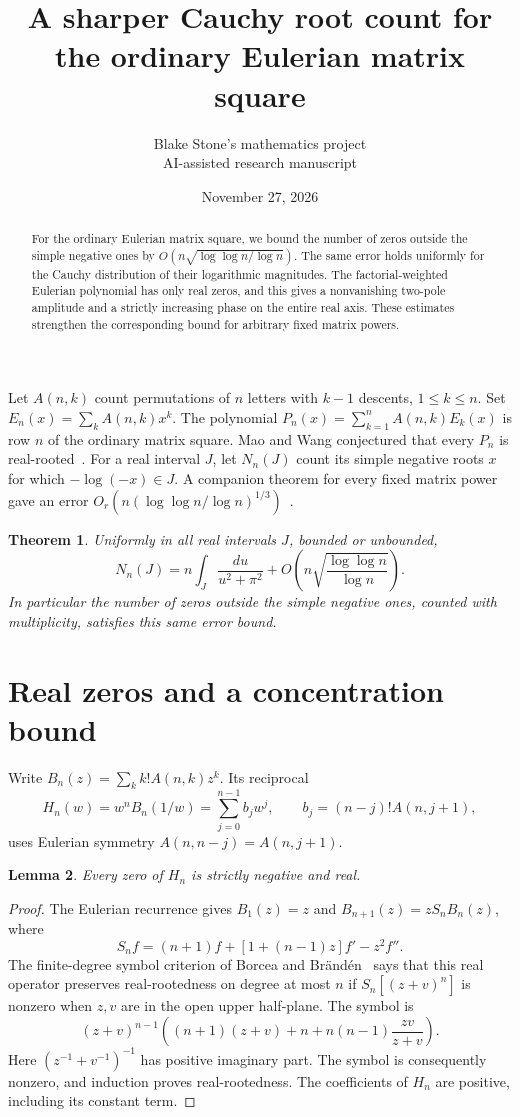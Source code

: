 \documentclass[11pt]{article}
\title{A sharper Cauchy root count for the ordinary Eulerian matrix square}
\author{Blake Stone's mathematics project\\ \small AI-assisted research manuscript}
\date{November 27, 2026}
\newtheorem{theorem}{Theorem}
\newtheorem{lemma}[theorem]{Lemma}
\begin{document}
\maketitle
\begin{abstract}
For the ordinary Eulerian matrix square, we bound the number of zeros outside the simple negative ones by $O(n\sqrt{\log\log n/\log n})$. The same error holds uniformly for the Cauchy distribution of their logarithmic magnitudes. The factorial-weighted Eulerian polynomial has only real zeros, and this gives a nonvanishing two-pole amplitude and a strictly increasing phase on the entire real axis. These estimates strengthen the corresponding bound for arbitrary fixed matrix powers.
\end{abstract}

Let $A(n,k)$ count permutations of $n$ letters with $k-1$ descents, $1\le k\le n$. Set $E_n(x)=\sum_k A(n,k)x^k$. The polynomial $P_n(x)=\sum_{k=1}^n A(n,k)E_k(x)$ is row $n$ of the ordinary matrix square. Mao and Wang conjectured that every $P_n$ is real-rooted~\cite{MW}. For a real interval $J$, let $N_n(J)$ count its simple negative roots $x$ for which $-\log(-x)\in J$. A companion theorem for every fixed matrix power gave an error $O_r(n(\log\log n/\log n)^{1/3})$~\cite{bulk}.

\begin{theorem}\label{main}
Uniformly in all real intervals $J$, bounded or unbounded,
\[
 N_n(J)=n\int_J\frac{du}{u^2+\pi^2}
          +O\!\left(n\sqrt{\frac{\log\log n}{\log n}}\right).
\]
In particular the number of zeros outside the simple negative ones, counted with multiplicity, satisfies this same error bound.
\end{theorem}

\section{Real zeros and a concentration bound}

Write $B_n(z)=\sum_k k!A(n,k)z^k$. Its reciprocal
\[
 H_n(w)=w^n B_n(1/w)=\sum_{j=0}^{n-1}b_j w^j,\qquad b_j=(n-j)!A(n,j+1),
\]
uses Eulerian symmetry $A(n,n-j)=A(n,j+1)$.

\begin{lemma}\label{rr}
Every zero of $H_n$ is strictly negative and real.
\end{lemma}
\begin{proof}
The Eulerian recurrence gives $B_1(z)=z$ and $B_{n+1}(z)=zS_n B_n(z)$, where
\[
 S_nf=(n+1)f+[1+(n-1)z]f'-z^2 f''.
\]
The finite-degree symbol criterion of Borcea and Br\"and\'en~\cite[Theorem~4]{BB} says that this real operator preserves real-rootedness on degree at most $n$ if $S_n[(z+v)^n]$ is nonzero when $z,v$ are in the open upper half-plane. The symbol is
\[
 (z+v)^{n-1}
 \left((n+1)(z+v)+n+n(n-1)\frac{zv}{z+v}\right).
\]
Here $(z^{-1}+v^{-1})^{-1}$ has positive imaginary part. The symbol is consequently nonzero, and induction proves real-rootedness. The coefficients of $H_n$ are positive, including its constant term.
\end{proof}
\end{document}
